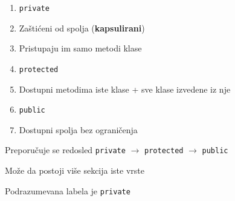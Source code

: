 \documentclass{article}
\newenvironment{xitemize}{%
    
    \itemize
    \larger
}{%
    \enditemize
}
\let\olditemize\itemize
\let\endolditemize\enditemize
\renewenvironment{itemize}{%
    \smaller
    \olditemize
}{%
    \endolditemize
}
\providecommand{\inlinecode}[1]{\texttt{#1}}
\begin{document}
\begin{xitemize}
\begin{itemize}
\end{itemize}
\begin{enumerate}
    \item \inlinecode{private}
    \begin{itemize}
        \item Zaštićeni od spolja (\textbf{kapsulirani})
        \item Pristupaju im samo metodi klase
    \end{itemize}
    \item \inlinecode{protected}
    \begin{itemize}
        \item Dostupni metodima iste klase + sve klase izvedene iz nje
    \end{itemize}
    \item \inlinecode{public}
    \begin{itemize}
        \item Dostupni spolja bez ograničenja
    \end{itemize}
\end{enumerate}
\begin{itemize}
    \item Preporučuje se redosled \inlinecode{private} $\rightarrow$ \inlinecode{protected} $\rightarrow$ \inlinecode{public}
    \item Može da postoji više sekcija iste vrste
    \item Podrazumevana labela je \inlinecode{private}


\end{itemize}
\end{xitemize}
\end{document}
